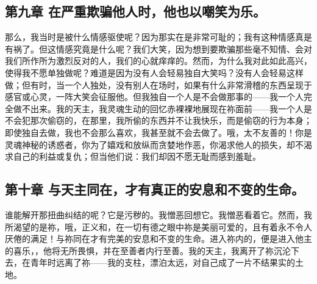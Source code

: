 
\subsection{第九章 在严重欺骗他人时，他也以嘲笑为乐。}

那么，我当时是被什么情感驱使呢？因为那实在是非常可耻的；我有这种情感真是有祸了。但这情感究竟是什么呢？我们大笑，因为想到要欺骗那些毫不知情、会对我们所作所为激烈反对的人，我们的心就痒痒的。然而，为什么我对此如此高兴，使得我不愿单独做呢？难道是因为没有人会轻易独自大笑吗？没有人会轻易这样做；但有时，当一个人独处，没有别人在场时，如果有什么非常滑稽的东西呈现于感官或心灵，一阵大笑会征服他。但我独自一个人是不会做那事的——我一个人完全做不出来。我的天主，我灵魂生动的回忆赤裸裸地展现在祢面前——我一个人是不会犯那次偷窃的，在那里，我所偷的东西并不让我快乐，而是偷窃的行为本身；即使独自去做，我也不会那么喜欢，我甚至就不会去做了。哦，太不友善的！你是灵魂神秘的诱惑者，你为了嬉戏和放纵而贪婪地作恶，你渴求他人的损失，却不渴求自己的利益或复仇；但当他们说：我们却因不愿无耻而感到羞耻。\par


\subsection{第十章 与天主同在，才有真正的安息和不变的生命。}

谁能解开那扭曲纠结的呢？它是污秽的。我憎恶回想它。我憎恶看着它。然而，我所渴望的是祢，哦，正义和，在一切有德之眼中祢是美丽可爱的，且有着永不令人厌倦的满足！与祢同在才有完美的安息和不变的生命。进入祢内的，便是进入他主的喜乐，，他将无所畏惧，并在至善者内行至善。我的天主，我离开了祢沉沦下去，在青年时远离了祢——我的支柱，漂泊太远，对自己成了一片不结果实的土地。\par



